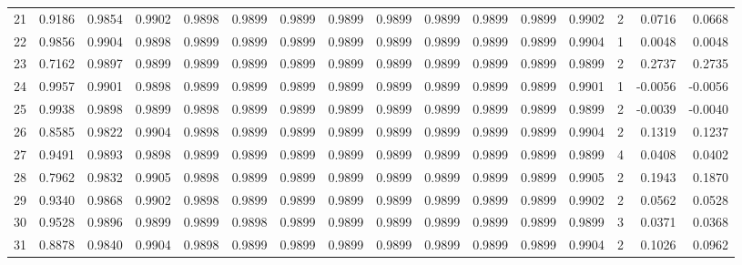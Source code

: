 \begin{tabular}{lrrrrrrrrrrrrrrr}
21  &      0.9186 &  0.9854 &  0.9902 &  0.9898 &  0.9899 &  0.9899 &  0.9899 &  0.9899 &  0.9899 &  0.9899 &   0.9899 &     0.9902 &      2 &                    0.0716 &                     0.0668 \\
22  &      0.9856 &  0.9904 &  0.9898 &  0.9899 &  0.9899 &  0.9899 &  0.9899 &  0.9899 &  0.9899 &  0.9899 &   0.9899 &     0.9904 &      1 &                    0.0048 &                     0.0048 \\
23  &      0.7162 &  0.9897 &  0.9899 &  0.9899 &  0.9899 &  0.9899 &  0.9899 &  0.9899 &  0.9899 &  0.9899 &   0.9899 &     0.9899 &      2 &                    0.2737 &                     0.2735 \\
24  &      0.9957 &  0.9901 &  0.9898 &  0.9899 &  0.9899 &  0.9899 &  0.9899 &  0.9899 &  0.9899 &  0.9899 &   0.9899 &     0.9901 &      1 &                   -0.0056 &                    -0.0056 \\
25  &      0.9938 &  0.9898 &  0.9899 &  0.9898 &  0.9899 &  0.9899 &  0.9899 &  0.9899 &  0.9899 &  0.9899 &   0.9899 &     0.9899 &      2 &                   -0.0039 &                    -0.0040 \\
26  &      0.8585 &  0.9822 &  0.9904 &  0.9898 &  0.9899 &  0.9899 &  0.9899 &  0.9899 &  0.9899 &  0.9899 &   0.9899 &     0.9904 &      2 &                    0.1319 &                     0.1237 \\
27  &      0.9491 &  0.9893 &  0.9898 &  0.9899 &  0.9899 &  0.9899 &  0.9899 &  0.9899 &  0.9899 &  0.9899 &   0.9899 &     0.9899 &      4 &                    0.0408 &                     0.0402 \\
28  &      0.7962 &  0.9832 &  0.9905 &  0.9898 &  0.9899 &  0.9899 &  0.9899 &  0.9899 &  0.9899 &  0.9899 &   0.9899 &     0.9905 &      2 &                    0.1943 &                     0.1870 \\
29  &      0.9340 &  0.9868 &  0.9902 &  0.9898 &  0.9899 &  0.9899 &  0.9899 &  0.9899 &  0.9899 &  0.9899 &   0.9899 &     0.9902 &      2 &                    0.0562 &                     0.0528 \\
30  &      0.9528 &  0.9896 &  0.9899 &  0.9899 &  0.9898 &  0.9899 &  0.9899 &  0.9899 &  0.9899 &  0.9899 &   0.9899 &     0.9899 &      3 &                    0.0371 &                     0.0368 \\
31  &      0.8878 &  0.9840 &  0.9904 &  0.9898 &  0.9899 &  0.9899 &  0.9899 &  0.9899 &  0.9899 &  0.9899 &   0.9899 &     0.9904 &      2 &                    0.1026 &                     0.0962 \\

\end{tabular}
